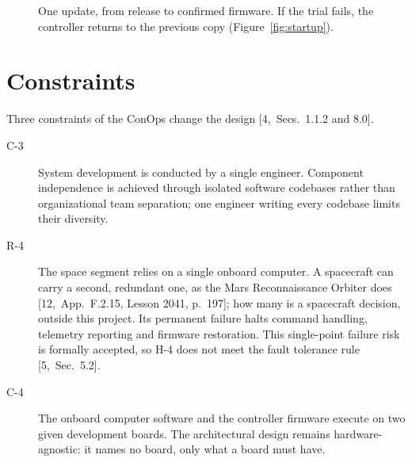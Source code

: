 \documentclass[11pt,a4paper]{article}
\begin{document}
\begin{figure}[H]
\centering
{}
\caption{One update, from release to confirmed firmware. If the trial fails,
the controller returns to the previous copy (Figure~\ref{fig:startup}).}
\label{fig:update}
\end{figure}

\section{Constraints}
Three constraints of the ConOps change the design [4,~Secs.~1.1.2 and 8.0].
\begin{description}
\item[C-3] System development is conducted by a single engineer. Component
  independence is achieved through isolated software codebases rather than
  organizational team separation; one engineer writing every codebase limits
  their diversity.
\item[R-4] The space segment relies on a single onboard computer. A spacecraft
  can carry a second, redundant one, as the Mars Reconnaissance Orbiter does
  [12,~App.~F.2.15, Lesson 2041, p.~197]; how many is a spacecraft decision,
  outside this project. Its permanent failure halts command handling,
  telemetry reporting and firmware restoration. This single-point failure risk
  is formally accepted, so H-4 does not meet the fault tolerance rule
  [5,~Sec.~5.2].
\item[C-4] The onboard computer software and the controller firmware execute on
  two given development boards. The architectural design remains
  hardware-agnostic: it names no board, only what a board must have.
\end{description}
\end{document}
